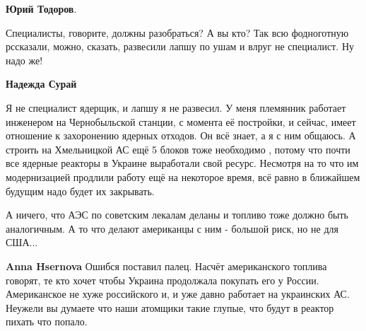 \begin{itemize}
\begin{itemize}
 
\textbf{Юрий Тодоров}. 

Специалисты, говорите, должны разобраться? А вы кто? Так всю фодноготную
рссказали, можно, сказать, развесили лапшу по ушам и влруг не специалист. Ну
надо же!


 
\textbf{Надежда Сурай} 

Я не специалист ядерщик, и лапшу я не развесил. У меня племянник работает
инженером на Чернобыльской станции, с момента её постройки, и сейчас, имеет
отношение к захоронению ядерных отходов. Он всё знает, а я с ним общаюсь. А
строить на Хмельницкой АС ещё 5 блоков тоже необходимо , потому что почти все
ядерные реакторы в Украине выработали свой ресурс. Несмотря на то что им
модернизацией продлили работу ещё на некоторое время, всё равно в ближайшем
будущим надо будет их закрывать.


 

А ничего, что АЭС по советским лекалам деланы и топливо тоже должно быть
аналогичным. А то что делают американцы с ним - большой риск, но не для США...

 
\textbf{Anna Hsernova} Ошибся поставил палец. Насчёт американского топлива говорят, те кто хочет чтобы Украина продолжала покупать его у России. Американское не хуже российского и, и уже давно работает на украинских АС. Неужели вы думаете что наши атомщики такие глупые, что будут в реактор пихать что попало.


\end{itemize}
\end{itemize}
